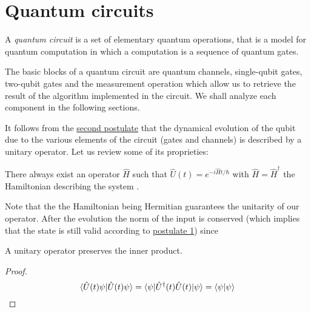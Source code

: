 \section{Quantum circuits}
A \emph{quantum circuit} is a set of elementary quantum operations, that is a model for quantum computation in which a computation is a sequence of quantum gates.

The basic blocks of a quantum circuit are quantum channels, single-qubit gates, two-qubit gates and the measurement operation which allow us to retrieve the result of the algorithm implemented in the circuit. We shall analyze each component in the following sections.

It follows from the \hyperref[postulate:2]{second postulate} that the dynamical evolution of the qubit due to the various elements of the circuit (gates and channels) is described by a unitary operator. Let us review some of its proprieties: 
\begin{theorem}\label{theorem:1}
There always exist an operator $\hat{H}$ such that $\hat{U}(t) = e^{-i\hat{H}t/\hbar}$ with $\hat{H} = \hat{H}^\dagger$ the Hamiltonian describing the system \cite[145]{Shankar}.
\end{theorem}

Note that the the Hamiltonian being Hermitian guarantees the unitarity of our operator. After the evolution the norm of the input is conserved (which implies that the state is still valid according to \hyperref[postulate:1]{postulate 1}) since
\begin{theorem}
A unitary operator preserves the inner product.
\end{theorem}
\begin{proof}
\begin{equation*}
    \braket{\hat{U}(t)\psi | \hat{U}(t)\psi} = \braket{ \psi | \hat{U}^\dagger(t)\hat{U}(t) | \psi} = \braket{\psi | \psi}
\end{equation*}
\end{proof}


